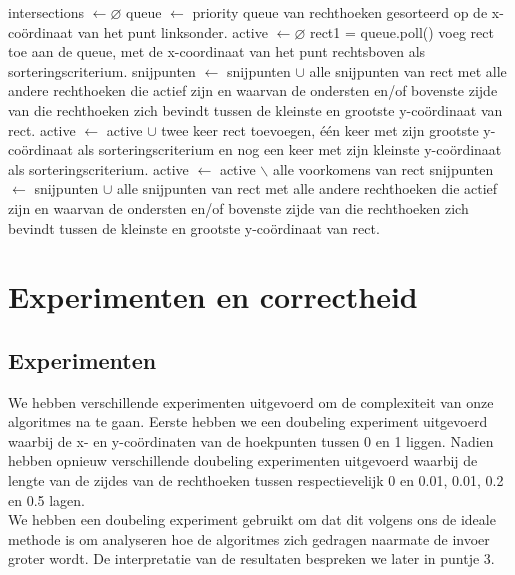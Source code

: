 \documentclass[11pt,a4paper,titlepage]{article}
\begin{document}
		\begin{algorithm}[H]
			\caption{}
			\begin{algorithmic}[1]
				\State intersections $\gets \varnothing $
				\State queue $\gets$ priority queue van rechthoeken gesorteerd op de x-coördinaat van het punt linksonder.
				\State active $\gets \varnothing$
				\State rect1 = queue.poll()
				\State voeg rect toe aan de queue, met de x-coordinaat van het punt rechtsboven als sorteringscriterium.
				\State snijpunten $\gets$ snijpunten $\cup$ alle snijpunten van rect met alle andere rechthoeken die actief zijn en waarvan de ondersten en/of bovenste zijde van die rechthoeken zich bevindt tussen de kleinste en grootste y-coördinaat van rect.
				\State active $\gets$ active $\cup$ twee keer rect toevoegen, één keer met zijn grootste y-coördinaat als sorteringscriterium en nog een keer met zijn kleinste y-coördinaat als sorteringscriterium.
				\Else
				\State active $\gets$ active $\backslash$ alle voorkomens van rect
				\State snijpunten $\gets$ snijpunten $\cup$ alle snijpunten van rect met alle andere rechthoeken die actief zijn en waarvan de ondersten en/of bovenste zijde van die rechthoeken zich bevindt tussen de kleinste en grootste y-coördinaat van rect.
				\EndIf
				\EndWhile
			\end{algorithmic}
		\end{algorithm}
	
	\section{Experimenten en correctheid}
		\subsection{Experimenten}
		We hebben verschillende experimenten uitgevoerd om de complexiteit van onze algoritmes na te gaan. Eerste hebben we een doubeling experiment uitgevoerd waarbij de x- en y-coördinaten van de hoekpunten tussen 0 en 1 liggen.  Nadien hebben opnieuw verschillende doubeling experimenten uitgevoerd waarbij de lengte van de zijdes van de rechthoeken tussen  respectievelijk 0 en 0.01, 0.01, 0.2 en 0.5 lagen.\\ We hebben een doubeling experiment gebruikt om dat dit volgens ons de ideale methode is om analyseren hoe de algoritmes zich gedragen naarmate de invoer groter wordt. De interpretatie van de resultaten bespreken we later in puntje 3.
\end{document}

